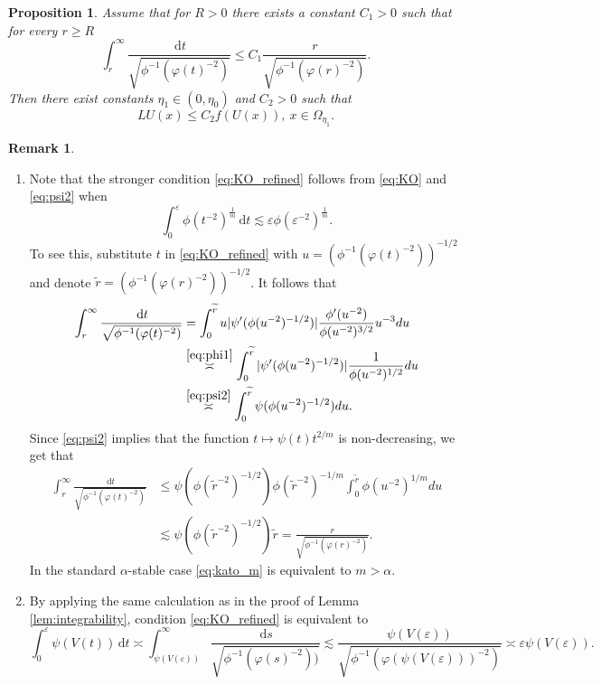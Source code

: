 \documentclass[a4paper,12pt,draft]{article}
\theoremstyle{plain}
\newtheorem{prop}[thm]{Proposition}
\theoremstyle{definition}
\newtheorem{remark}[thm]{Remark}
\numberwithin{equation}{section}
\renewcommand{\leq}{\leqslant}
\renewcommand{\geq}{\geqslant}
\newcommand{\1}{1}
\newcommand{\ds} {\, \mathrm{d}s}
\newcommand{\dt} {\, \mathrm{d}t}
\begin{document}
\begin{prop}\label{prop:supersolution}
Assume that for $R>0$ there exists a constant $C_1>0$ such that for every $r\geq R$
\begin{equation}\label{eq:KO_refined}
\int_r^\infty \frac{\dt}{\sqrt{\phi^{-1}(\varphi(t)^{-2})}}\leq C_1 \frac{r}{\sqrt{\phi^{-1}(\varphi(r)^{-2})}}.
\end{equation}
Then there exist constants $\eta_1\in(0,\eta_0)$ and $C_2>0$ such that 
\[
LU(x)\leq C_2 f(U(x)),\ x\in\Omega_{\eta_1}.
\]
\end{prop}
\begin{remark}\label{rem:KO_refined}
\begin{enumerate}
 \item Note that the stronger condition \eqref{eq:KO_refined} follows from \eqref{eq:KO} and \eqref{eq:psi2} when 
 \begin{equation}\label{eq:kato_m}
\int_0^\varepsilon \phi(t^{-2})^{\frac 1{m}}\dt \lesssim \varepsilon  \phi(\varepsilon^{-2})^{\frac 1{m}}.   
 \end{equation}
 To see this, substitute $t$ in \eqref{eq:KO_refined} with $u=(\phi^{-1}(\varphi(t)^{-2}))^{-1/2}$ and denote $\widetilde{r}=(\phi^{-1}(\varphi(r)^{-2}))^{-1/2}$. It follows that
\begin{align*}
\int_r^\infty \frac{\dt}{\sqrt{\phi^{-1}(\varphi(t)^{-2})}}&= \int_0^{\widetilde{r}} u|\psi'(\phi(u^{-2})^{-1/2})|\frac{\phi'(u^{-2})}{\phi(u^{-2})^{3/2}}u^{-3}du\\
&\overset{\eqref{eq:phi1}}{\asymp} \int_0^{\widetilde{r}} |\psi'(\phi(u^{-2})^{-1/2})|\frac{1}{\phi(u^{-2})^{1/2}}du\\
&\overset{\eqref{eq:psi2}}{\asymp} \int_0^{\widetilde{r}} \psi(\phi(u^{-2})^{-1/2})du.
\end{align*}
Since \eqref{eq:psi2} implies that the function $t\mapsto\psi(t)t^{2/m}$ is non-decreasing, we get that 
\begin{align*}
\int_r^\infty \frac{\dt}{\sqrt{\phi^{-1}(\varphi(t)^{-2})}}&\leq \psi(\phi(\widetilde{r}^{-2})^{-1/2})\phi(\widetilde{r}^{-2})^{-1/m} \int_0^{\widetilde{r}} \phi(u^{-2})^{1/m}du\\
&\lesssim \psi(\phi(\widetilde{r}^{-2})^{-1/2})\widetilde{r}=\frac{r}{\sqrt{\phi^{-1}(\varphi(r)^{-2})}}.
\end{align*}
 In the standard $\alpha$-stable case \eqref{eq:kato_m} is equivalent to $m>\alpha$.
 
\item By applying the same calculation as in the proof of Lemma \ref{lem:integrability}, condition \eqref{eq:KO_refined} is equivalent to 
\begin{equation}\label{eq:psi-V-integral}
 \int_0^{\varepsilon}\psi(V(t))\dt\asymp\int_{\psi(V(\varepsilon))}^\infty \frac{\ds}{\sqrt{\phi^{-1}(\varphi(s)^{-2}))}}\lesssim \frac{\psi(V(\varepsilon))}{\sqrt{\phi^{-1}(\varphi(\psi(V(\varepsilon)))^{-2})}}\asymp \varepsilon\psi(V(\varepsilon)).
\end{equation}
\end{enumerate}
\end{remark}
\end{document}
